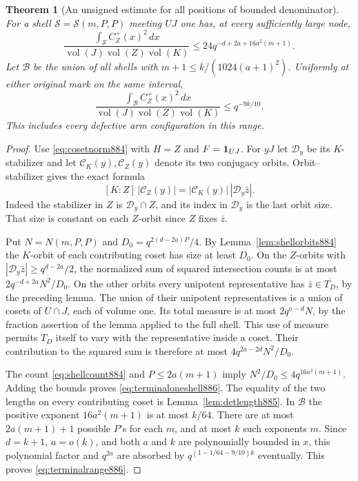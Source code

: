 \documentclass[a4paper,11pt]{article}
\newtheorem{theorem}[proposition]{Theorem}
\theoremstyle{definition}
\theoremstyle{remark}
\numberwithin{equation}{section}
\begin{document}
\begin{theorem}[An unsigned estimate for all positions of bounded denominator]
\leavevmode\label{thm:terminalrange886}
For a shell \(\mathcal S=\mathcal S(m,P,P)\) meeting \(UJ\)
one has, at every sufficiently large node,
\begin{equation}
 \frac{\int_{\mathcal S}C_Z^+(x)^2\,dx}
      {\operatorname{vol}(J)\operatorname{vol}(Z)\operatorname{vol}(K)}
          \le 24 q^{-d+2a+16a^2(m+1)} .
 \label{eq:terminaloneshell886}
\end{equation}
Let \(\mathcal B\) be the union of all shells with
\(m+1\le k/(1024(a+1)^2)\). Uniformly at either original mark
on the same interval,
\begin{equation}
 \frac{\int_{\mathcal B} C_Z^+(x)^2\,dx}
      {\operatorname{vol}(J)\operatorname{vol}(Z)\operatorname{vol}(K)}
                    \le q^{-9k/10}.
 \label{eq:terminalrange886}
\end{equation}
This includes every defective arm configuration in this range.
\end{theorem}
\begin{proof}
Use \eqref{eq:cosetnorm884} with \(H=Z\) and
\(F={\bf1}_{UJ}\). For \(yJ\) let \(\mathcal D_y\) be its
\(K\)-stabilizer and let \(\mathcal C_K(y),\mathcal C_Z(y)\) denote
its two conjugacy orbits. Orbit--stabilizer gives the exact formula
\[
  [K:Z]\,|\mathcal C_Z(y)|
          =|\mathcal C_K(y)|\,|\mathcal D_y\bar z|.
\]
Indeed the stabilizer in \(Z\) is
\(\mathcal D_y\cap Z\), and its index in \(\mathcal D_y\)
is the last orbit size. That size is constant on each
\(Z\)-orbit since \(Z\) fixes \(\bar z\).

Put \(N=N(m,P,P)\) and \(D_0=q^{2(d-2a)P}/4\).
By Lemma~\ref{lem:shellorbits884} the \(K\)-orbit of each
contributing coset has size at least \(D_0\). On the \(Z\)-orbits
with \(|\mathcal D_y\bar z|\ge q^{d-2a}/2\), the normalized sum
of squared intersection counts is at most
\(2q^{-d+2a}N^2/D_0\). On the other orbits every unipotent
representative has \(\bar z\in\overline{T_D}\), by the preceding
lemma. The union of their unipotent representatives is a union
of cosets of \(U\cap J\), each of volume one. Its total measure
is at most \(2q^{a-d}N\), by the fraction assertion of the
lemma applied to the full shell. This use of measure permits
\(T_D\) itself to vary with the representative inside a coset.
Their contribution to the squared sum is therefore at most
\(4q^{2a-2d}N^2/D_0\).

The count \eqref{eq:shellcount884} and \(P\le2a(m+1)\) imply
\(N^2/D_0\le4q^{16a^2(m+1)}\). Adding the bounds proves
\eqref{eq:terminaloneshell886}. The equality of the two lengths
on every contributing coset is Lemma~\ref{lem:detlength885}.
In \(\mathcal B\) the positive exponent \(16a^2(m+1)\) is
at most \(k/64\). There are at most \(2a(m+1)+1\) possible
\(P\)'s for each \(m\), and at most \(k\) such exponents \(m\).
Since \(d=k+1\), \(a=o(k)\), and both \(a\) and \(k\) are
polynomially bounded in \(x\), this polynomial factor and
\(q^{2a}\) are absorbed by \(q^{(1-1/64-9/10)k}\) eventually.
This proves \eqref{eq:terminalrange886}.
\end{proof}
\end{document}
